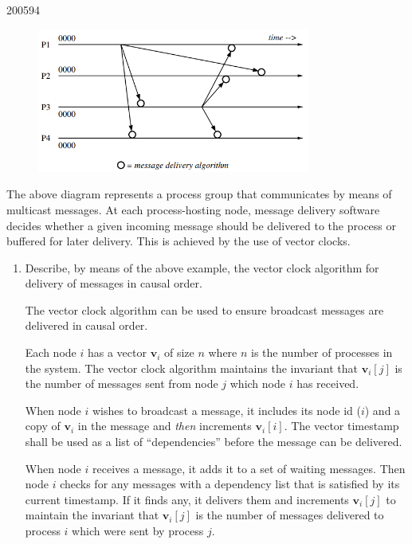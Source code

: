 \documentclass[10pt,\jkfside,a4paper]{article}
\begin{document}
\begin{examquestion}{2005}{9}{4}

\begin{figure}[H]
\centering
\includegraphics[width=0.8\textwidth]{./examquestion2005_9_4_multicast_diagram}
\end{figure}

The above diagram represents a process group that communicates by means of
multicast messages. At each process-hosting node, message delivery software
decides whether a given incoming message should be delivered to the process
or buffered for later delivery. This is achieved by the use of vector clocks.

\begin{enumerate}[label=(\alph*)]

\item Describe, by means of the above example, the vector clock algorithm
for delivery of messages in causal order.

The vector clock algorithm can be used to ensure broadcast messages are
delivered in causal order.

Each node $i$ has a vector $\mathbf{v}_i$ of size $n$ where $n$ is the number
of processes in the system. The vector clock algorithm maintains the
invariant that $\mathbf{v}_i[j]$ is the number of messages sent from node
$j$ which node $i$ has received.

When node $i$ wishes to broadcast a message, it includes its node id ($i$)
and a copy of $\mathbf{v}_i$ in the message and \textit{then} increments
$\mathbf{v}_i[i]$. The vector timestamp shall be used as a list of
``dependencies'' before the message can be delivered.

When node $i$ receives a message, it adds it to a set of waiting messages.
Then node $i$ checks for any messages with a dependency list that is
satisfied by its current timestamp. If it finds any, it delivers them and
increments $\mathbf{v}_i[j]$ to maintain the invariant that
$\mathbf{v}_i[j]$ is the number of messages delivered to process $i$ which
were sent by process $j$.


\end{enumerate}
\end{examquestion}
\end{document}
